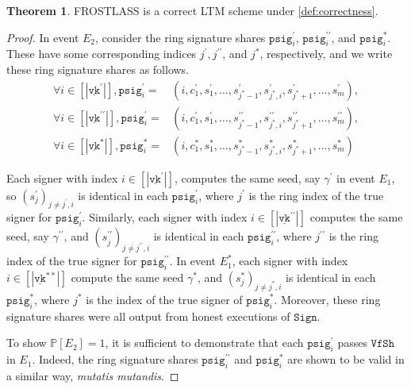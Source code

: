 \documentclass[11pt]{article}
\theoremstyle{definition}
\newtheorem{theorem}{Theorem}[section]
\newcommand{\VK}{\underline{\texttt{vk}}}
\newcommand{\psig}{\texttt{psig}}
\newcommand{\sign}{\texttt{Sign}}
\newcommand{\verifyshare}{\texttt{VfSh}}
\begin{document}
\begin{theorem}
FROSTLASS is a correct LTM scheme under \cref{def:correctness}.
\end{theorem}
\begin{proof}
In event $E_2$, consider the ring signature shares $\psig_i^\prime$, $\psig_i^{\prime \prime}$, and $\psig_i^*$. These have some corresponding indices $j^\prime, j^{\prime \prime}$, and $j^*$, respectively, and we write these ring signature shares as follows.
\begin{align*}
\forall i \in \left[\left|\VK^\prime\right|\right], \psig_i^\prime =& (i, c_1^\prime, s_1^\prime, \ldots, s_{j^*-1}^\prime, s_{j^*, i}^\prime, s_{j^*+1}^\prime, \ldots, s_m^\prime),  \\
\forall i \in \left[\left|\VK^{\prime\prime}\right|\right], \psig_i^\prime =& (i, c_1^\prime, s_1^\prime, \ldots, s_{j^*-1}^{\prime\prime}, s_{j^*, i}^{\prime\prime}, s_{j^*+1}^{\prime\prime}, \ldots, s_m^{\prime\prime}),  \\
\forall i \in \left[\left|\VK^*\right|\right], \psig_i^* =& (i, c_1^*, s_1^*, \ldots, s_{j^*-1}^*, s_{j^*, i}^*, s_{j^*+1}^*, \ldots, s_m^*)
\end{align*}  

Each signer with index $i \in \left[\left|\VK^\prime\right|\right]$, computes the same seed, say $\gamma^\prime$ in event $E_1$, so $(s_j^\prime)_{j \neq j^{\prime}, i}$ is identical in each $\psig_i^\prime$, where $j^\prime$ is the ring index of the true signer for $\psig_i^\prime$. Similarly, each signer with index $i \in \left[\left|\VK^{\prime\prime}\right|\right]$ computes the same seed, say $\gamma^{\prime \prime}$, and $(s_j^{\prime \prime})_{j \neq j^{\prime \prime}, i}$ is identical in each $\psig_i^{\prime \prime}$, where $j^{\prime \prime}$ is the ring index of the true signer for $\psig_i^{\prime \prime}$. In event $E_1^*$, each signer with index $i \in \left[\left|\VK^{**}\right|\right]$ 
compute the same seed $\gamma^*$, and $(s_j^*)_{j \neq j^*, i}$ is identical in each $\psig_i^*$, where $j^*$ is the index of the true signer of $\psig_i^*$. Moreover, these ring signature shares were all output from honest executions of $\sign$. 

To show $\mathbb{P}[E_2] = 1$, it is sufficient to demonstrate that each $\psig_i^\prime$ passes $\verifyshare$ in $E_1$. Indeed, the ring signature shares $\psig_i^{\prime \prime}$ and $\psig_i^*$ are shown to be valid in a similar way, \textit{mutatis mutandis}. 


\end{proof}
\end{document}
